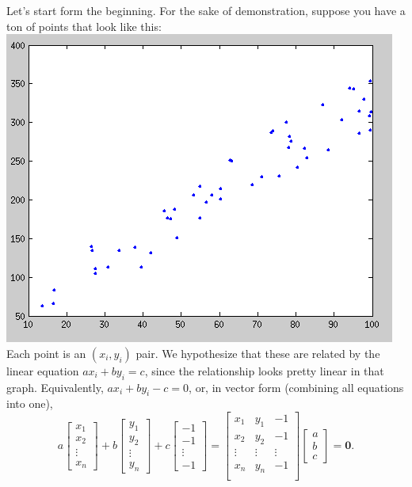 \documentclass[11pt]{article}
\begin{document}
Let's start form the beginning. For the sake of demonstration, suppose you have a ton of points that
look like this:\\
\includegraphics[scale=0.5]{images/random_points.png}\\

Each point is an $(x_i, y_i)$ pair. We hypothesize that these are related by the linear equation
$ax_i + by_i = c$, since the relationship looks pretty linear in that graph. Equivalently, $ax_i +
by_i - c = 0$, or, in vector form (combining all equations into one), 
\[a\begin{bmatrix}x_1 \\ x_2 \\ \vdots \\ x_n\end{bmatrix} + b\begin{bmatrix}y_1 \\ y_2 \\ \vdots \\
y_n\end{bmatrix} + c\begin{bmatrix}-1 \\ -1 \\ \vdots \\ -1\end{bmatrix} = \begin{bmatrix}
x_1 & y_1 & -1 \\ x_2 & y_2 & -1 \\ \vdots & \vdots & \vdots \\ x_n & y_n & -1 \\
\end{bmatrix}\begin{bmatrix}a \\ b \\ c\end{bmatrix} = \textbf{0}.\]
\end{document}
